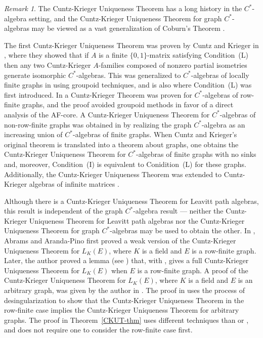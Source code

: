 \documentclass[11pt]{amsart}
\theoremstyle{remark}
\newtheorem{remark}[theorem]{Remark}
\numberwithin{equation}{section}
\begin{document}
\begin{remark} \label{CKUT-better-rem}
The Cuntz-Krieger Uniqueness Theorem has a long history in the $C^*$-algebra setting, and the Cuntz-Krieger Uniqueness Theorem for graph $C^*$-algebras may be viewed as a vast generalization of Coburn's Theorem \cite[Theorem~3.5.18]{Mur}.  

The first Cuntz-Krieger Uniqueness Theorem was proven by Cuntz and Krieger in \cite[Theorem~2.13]{CK}, where they showed that if $A$ is a finite $\{0, 1\}$-matrix satisfying Condition~(L) then any two Cuntz-Krieger $A$-families composed of nonzero partial isometries generate isomorphic $C^*$-algebras.  This was generalized to $C^*$-algebras of locally finite graphs in \cite[Theorem~3.7]{KPR} using groupoid techniques, and \cite{KPR} is also where Condition~(L) was first introduced.  In \cite[Theorem~3.1]{BPRS} a Cuntz-Krieger Theorem was proven for $C^*$-algebras of row-finite graphs, and the proof avoided groupoid methods in favor of a direct analysis of the AF-core.  A Cuntz-Krieger Uniqueness Theorem for $C^*$-algebras of non-row-finite graphs was obtained in \cite[Theorem~1.5]{RS} by realizing the graph $C^*$-algebra as an increasing union of $C^*$-algebras of finite graphs.  When Cuntz and Krieger's original theorem \cite[Theorem~2.13]{CK} is translated into a theorem about graphs, one obtains the Cuntz-Krieger Uniqueness Theorem for $C^*$-algebras of finite graphs with no sinks and, moreover, Condition~(I) is equivalent to Conidition~(L) for these graphs.  Additionally, the Cuntz-Krieger Uniqueness Theorem was extended to Cuntz-Krieger algebras of infinite matrices \cite[Theorem~13.1]{EL}.

Although there is a Cuntz-Krieger Uniqueness Theorem for Leavitt path algebras, this result is independent of the graph $C^*$-algebra result --- neither the Cuntz-Krieger Uniqueness Theorem for Leavitt path algebras nor the Cuntz-Krieger Uniqueness Theorem for graph $C^*$-algebras may be used to obtain the other.  In \cite[Corollary~3.3]{AbrPino}, Abrams and Aranda-Pino first proved a weak version of the Cuntz-Krieger Uniqueness Theorem for $L_K(E)$, where $K$ is a field and $E$ is a row-finite graph.  Later, the author proved a lemma (see \cite[Lemma~6.5]{Tom10}) that, with \cite[Corollary~3.3]{AbrPino}, gives a full Cuntz-Krieger Uniqueness Theorem for $L_K(E)$ when $E$ is a row-finite graph.  A proof of the Cuntz-Krieger Uniqueness Theorem for $L_K(E)$, where $K$ is a field and $E$ is an arbitrary graph, was given by the author in \cite[Theorem~6.8]{Tom10}.  The proof in \cite{Tom10} uses the process of desingularization \cite[Lemma~6.7]{Tom10} to show that the Cuntz-Krieger Uniqueness Theorem in the row-finite case implies the Cuntz-Krieger Uniqueness Theorem for arbitrary graphs. The proof in Theorem~\ref{CKUT-thm} uses different techniques than \cite{AbrPino} or \cite{Tom10}, and does not require one to consider the row-finite case first. 
\end{remark}
\end{document}
